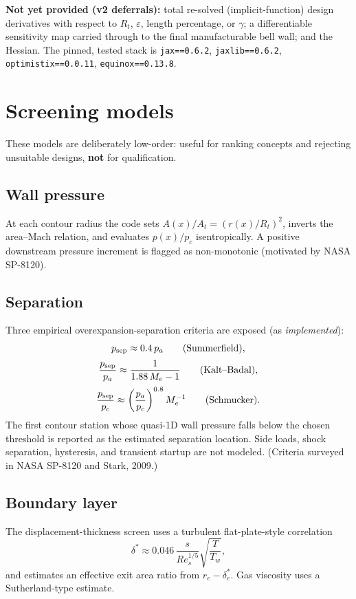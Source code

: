 \documentclass[11pt]{article}
\newcommand{\code}[1]{\texttt{#1}}
\begin{document}
\textbf{Not yet provided (v2 deferrals):} total re-solved (implicit-function)
design derivatives with respect to $R_t$, $\varepsilon$, length percentage,
or $\gamma$; a differentiable sensitivity map carried through to the final
manufacturable bell wall; and the Hessian. The pinned, tested stack is
\code{jax==0.6.2}, \code{jaxlib==0.6.2}, \code{optimistix==0.0.11},
\code{equinox==0.13.8}.

\section{Screening models}

These models are deliberately low-order: useful for ranking concepts and
rejecting unsuitable designs, \textbf{not} for qualification.

\subsection{Wall pressure}
At each contour radius the code sets $A(x)/A_t=\left(r(x)/R_t\right)^2$,
inverts the area--Mach relation, and evaluates $p(x)/p_c$ isentropically. A
positive downstream pressure increment is flagged as non-monotonic (motivated
by NASA SP-8120).

\subsection{Separation}
Three empirical overexpansion-separation criteria are exposed (as
\emph{implemented}):
\begin{gather}
p_{\mathrm{sep}}\approx 0.4\,p_a \qquad\text{(Summerfield)}, \notag \\[2pt]
\frac{p_{\mathrm{sep}}}{p_a}\approx\frac{1}{1.88\,M_e-1}\qquad\text{(Kalt--Badal)}, \\[2pt]
\frac{p_{\mathrm{sep}}}{p_c}\approx\left(\frac{p_a}{p_c}\right)^{0.8}M_e^{-1}\qquad\text{(Schmucker)}. \notag
\end{gather}
The first contour station whose quasi-1D wall pressure falls below the chosen
threshold is reported as the estimated separation location. Side loads,
shock separation, hysteresis, and transient startup are not modeled.
(Criteria surveyed in NASA SP-8120 and Stark, 2009.)

\subsection{Boundary layer}
The displacement-thickness screen uses a turbulent flat-plate-style
correlation
\begin{equation}
\delta^*\approx 0.046\,\frac{s}{Re_s^{1/5}}\sqrt{\frac{T}{T_w}},
\end{equation}
and estimates an effective exit area ratio from $r_e-\delta_e^*$. Gas
viscosity uses a Sutherland-type estimate.
\end{document}
